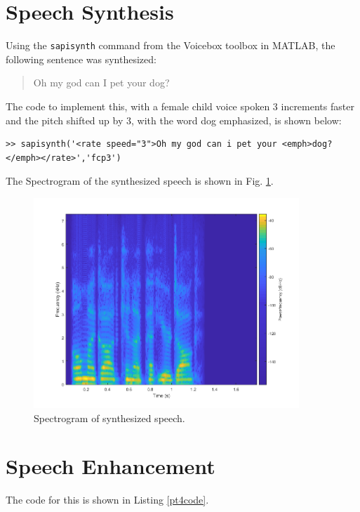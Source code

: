 \documentclass[letterpaper]{article}
\begin{document}
\section{Speech Synthesis}
Using the \texttt{sapisynth} command from the Voicebox toolbox in MATLAB, the following sentence was synthesized:
\begin{quote}
    Oh my god can I pet your dog?
\end{quote}

The code to implement this, with a female child voice spoken 3 increments faster and the pitch shifted up by 3, with the word dog emphasized, is shown below:

\begin{lstlisting}[caption = {Sentence of speech that was synthesized.}]
>> sapisynth('<rate speed="3">Oh my god can i pet your <emph>dog?</emph></rate>','fcp3')

\end{lstlisting}

The Spectrogram of the synthesized speech is shown in Fig. \ref{fig:spec}.

\begin{figure}[h!]
    \centering
    \includegraphics[width=10cm]{ee599hw5p3}
    \caption{Spectrogram of synthesized speech.}
    \label{fig:spec}
\end{figure}


\section{Speech Enhancement}

The code for this is shown in Listing \ref{pt4code}.
\end{document}
